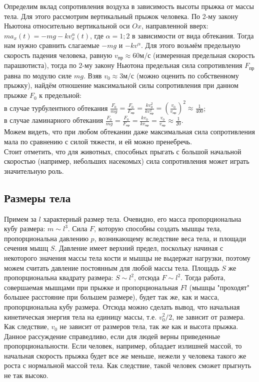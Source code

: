 \documentclass[a4paper,14pt]{article}
\begin{document}
Определим вклад сопротивления воздуха в зависимость высоты прыжка от массы тела. Для этого рассмотрим вертикальный прыжок человека. По 2-му закону Ньютона относительно вертикальной оси $Ox$, направленной вверх: $ma_x(t) = -mg - kv_x^{\alpha}(t)$, где $\alpha = {1; 2}$ в зависимости от вида обтекания. Тогда нам нужно сравнить слагаемые $-mg$ и $-kv^{\alpha}$. Для этого возьмём предельную скорость падения человека, равную $v_\text{пр} \approx 60 \text{м}/\text{с}$ (измеренная предельная скорость парашютиста), тогда по 2-му закону Ньютона предельная сила сопротивления $F_\text{пр}$ равна по модулю силе $mg$. Взяв $v_0 \approx 3 \text{м}/\text{с}$ (можно оценить по собственному прыжку), найдём отношение максимальной силы сопротивления при данном прыжке $F_0$ к предельной:
\\
в случае турбулентного обтекания $\frac{F_0}{mg} = \frac{F_0}{F_{пр}} = \frac{k v_0^2}{k v_{пр}^2} = (\frac{v_0}{v_{пр}})^2 \approx \frac{1}{400}$;
\\
в случае ламинарного обтекания $\frac{F_0}{mg} = \frac{F_0}{F_{пр}} = \frac{k v_0}{k v_{пр}} = \frac{v_0}{v_{пр}} \approx \frac{1}{20}$.
\\
\smallskip
Можем видеть, что при любом обтекании даже максимальная сила сопротивления мала по сравнению с силой тяжести, и ей можно пренебречь.
\\
Стоит отметить, что для животных, способных прыгать с большой начальной скоростью (например, небольших насекомых) сила сопротивления может играть значительную роль.

\subsection*{Размеры тела}

Примем за $l$ характерный размер тела. Очевидно, его масса пропорциональна кубу размера: $m \sim l^3$. Сила $F$, которую способны создать мышцы тела, пропорциональна давлению $p$, возникающему вследствие веса тела, и площади сечения мышц $S$. Давление имеет верхний предел, поскольку начиная с некоторого значения массы тела кости и мышцы не выдержат нагрузки, поэтому можем считать давление постоянным для любой массы тела. Площадь $S$ же пропорциональна квадрату размера: $S \sim l^2$, отсюда $F \sim l^2$. Тогда работа, совершаемая мышцами при прыжке и пропорциональная $Fl$ (мышцы "проходят" большее расстояние при большем размере), будет так же, как и масса, пропорциональна кубу размера. Отсюда можно сделать вывод, что начальная кинетическая энергия тела на единицу массы, т.е. $v_0^2/2$, не зависит от размера. Как следствие, $v_0$ не зависит от размеров тела, так же как и высота прыжка.
\\
Данное рассуждение справедливо, если для людей верны приведенные пропорциональности. Если человек, например, обладает излишней массой, то начальная скорость прыжка будет все же меньше, нежели у человека такого же роста с нормальной массой тела. Как следствие, такой человек сможет прыгнуть не так высоко.
\end{document}
